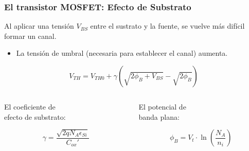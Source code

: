 \begin{frame}[t]
    \frametitle{El transistor MOSFET: Efecto de Substrato}

    Al aplicar una tensión $V_{BS}$ entre el sustrato y la fuente, se vuelve más difícil formar un canal.

    \begin{itemize}
        \item La tensión de umbral (necesaria para establecer el canal) aumenta.    
    \end{itemize}

    \[ V_{TH} = V_{TH0} + \gamma ( \sqrt{2 \phi_B + V_{BS}} - \sqrt{2 \phi_B} ) \]

    \vspace{5mm}
    \begin{columns}
        \begin{column}{0.5\textwidth}
            \centering
            El coeficiente de \\ efecto de substrato:

            \[ \gamma = \dfrac{\sqrt{2q N_A \epsilon_{Si}}}{C_{ox}'} \]
        \end{column}
        \begin{column}{0.5\textwidth}
            \centering
            El potencial de \\ banda plana:

            \[ \phi_B = V_t \cdot \ln \left( \dfrac{N_A}{n_i} \right) \]
        \end{column}
    \end{columns}
\end{frame}

